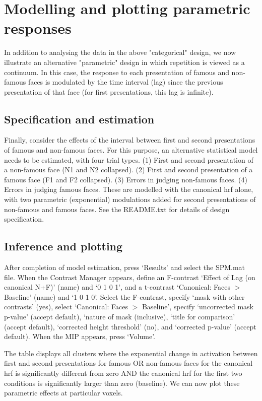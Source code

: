 \section{Modelling and plotting parametric responses}

In addition to analysing the data in the above "categorical" design, we now illustrate an alternative "parametric" design in which repetition is viewed as a continuum. In this case, the response to each presentation of famous and non-famous faces is modulated by the time interval (lag) since the previous presentation of that face (for first presentations, this lag is infinite). 

\subsection{Specification and estimation}

Finally, consider the effects of the interval between first and second presentations of famous and non-famous faces. For this purpose, an alternative statistical model needs to be estimated, with four trial types. (1) First and second presentation of a non-famous face (N1 and N2 collapsed). (2) First and second presentation of a famous face (F1 and F2 collapsed). (3) Errors in judging non-famous faces. (4) Errors in judging famous faces. These are modelled with the canonical hrf alone, with two parametric (exponential) modulations added for second presentations of non-famous and famous faces. See the README.txt for details of design specification.

\subsection{Inference and plotting}

After completion of model estimation, press `Results' and select the SPM.mat file. When the Contrast Manager appears, define an F-contrast `Effect of Lag (on canonical N+F)' (name) and `0 1 0 1', and a t-contrast `Canonical: Faces $>$ Baseline' (name) and `1 0 1 0'. Select the F-contrast, specify `mask with other contrasts' (yes), select `Canonical: Faces $>$ Baseline', specify `uncorrected mask p-value' (accept default), `nature of mask (inclusive), `title for comparison' (accept default), `corrected height threshold' (no), and `corrected p-value' (accept default). When the MIP appears, press `Volume'.

The table displays all clusters where the exponential change in activation between first and second presentations for famous OR non-famous faces for the canonical hrf is significantly different from zero AND the canonical hrf for the first two conditions is significantly larger than zero (baseline). We can now 
plot these parametric effects at particular voxels.

